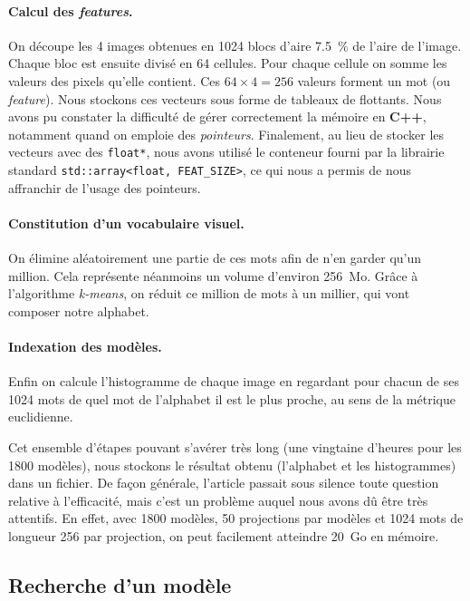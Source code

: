 \documentclass[12pt, a4paper, oneside]{article}
\begin{document}
\paragraph{Calcul des \emph{features}.}
On découpe les 4 images obtenues en \num{1024} blocs d'aire \SI{7.5}{\percent} de l'aire de l'image.
Chaque bloc est ensuite divisé en 64 cellules.
Pour chaque cellule on somme les valeurs des pixels qu'elle contient.
Ces $64 \times 4 = 256$ valeurs forment un mot (ou \emph{feature}).
Nous stockons ces vecteurs sous forme de tableaux de flottants.
Nous avons pu constater la difficulté de gérer correctement la mémoire en \textbf{C++}, notamment quand on emploie des \emph{pointeurs}.
Finalement, au lieu de stocker les vecteurs avec des \verb|float*|, nous avons utilisé le conteneur fourni par la librairie standard \verb|std::array<float, FEAT_SIZE>|, ce qui nous a permis de nous affranchir de l'usage des pointeurs.

\paragraph{Constitution d'un vocabulaire visuel.}
On élimine aléatoirement une partie de ces mots afin de n'en garder qu'un million.
Cela représente néanmoins un volume d'environ \num{256}~Mo.
Grâce à l'algorithme \emph{k-means}, on réduit ce million de mots à un millier, qui vont composer notre alphabet.

\paragraph{Indexation des modèles.}
Enfin on calcule l'histogramme de chaque image en regardant pour chacun de ses \num{1024} mots de quel mot de l'alphabet il est le plus proche, au sens de la métrique euclidienne.


Cet ensemble d'étapes pouvant s'avérer très long (une vingtaine d'heures pour les \num{1800} modèles), nous stockons le résultat obtenu (l'alphabet et les histogrammes) dans un fichier.
De façon générale, l'article passait sous silence toute question relative à l'efficacité, mais c'est un problème auquel nous avons dû être très attentifs.
En effet, avec \num{1800} modèles, 50 projections par modèles et \num{1024} mots de longueur 256 par projection, on peut facilement atteindre 20~Go en mémoire.


\subsection{Recherche d'un modèle}
\end{document}
